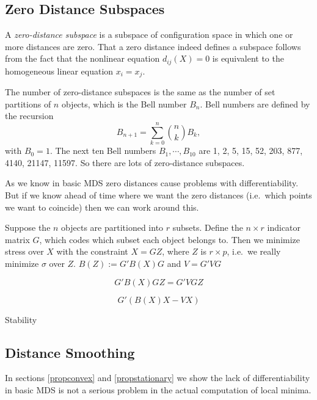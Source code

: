\documentclass[
  12pt,
]{book}
\theoremstyle{definition}
\theoremstyle{definition}
\theoremstyle{definition}
\theoremstyle{definition}
\theoremstyle{remark}
\begin{document}
\hypertarget{propzerodist}{%
\subsection{Zero Distance Subspaces}\label{propzerodist}}

A \emph{zero-distance subspace} is a subspace of configuration space in which one or more distances are zero. That a zero distance indeed defines a subspace follows from the fact that the nonlinear equation \(d_{ij}(X)=0\) is equivalent to the homogeneous linear equation \(x_i=x_j\).

The number of zero-distance subspaces is the same as the number of set partitions of \(n\) objects, which is the Bell number \(B_n\). Bell numbers are defined by the recursion
\begin{equation}
B_{n+1}=\sum_{k=0}^n\binom{n}{k}B_k, 
\label{eq:bellnums}
\end{equation}
with \(B_0=1\). The next ten Bell numbers \(B_1,\cdots,B_{10}\) are 1, 2, 5, 15, 52, 203, 877, 4140, 21147, 11597. So there are lots of zero-distance subspaces.

As we know in basic MDS zero distances cause problems with differentiability. But if we know ahead of time where we want the zero distances (i.e.~which points we want to coincide) then we can work around this.

Suppose the \(n\) objects are partitioned into \(r\) subsets. Define the \(n\times r\) indicator matrix \(G\), which codes which subset each object belongs to. Then we minimize stress over \(X\) with the constraint \(X=GZ\), where \(Z\) is \(r\times p\), i.e.~we really minimize \(\sigma\) over \(Z\).
\(B(Z):=G'B(X)G\) and \(V=G'VG\)

\[G'B(X)GZ=G'VGZ\]

\[G'(B(X)X-VX)\]

Stability

\hypertarget{propdistsmo}{%
\subsection{Distance Smoothing}\label{propdistsmo}}

In sections \ref{propconvex} and \ref{propstationary} we show the lack of differentiability
in basic MDS is not a serious problem in the actual computation of local minima.
\end{document}

